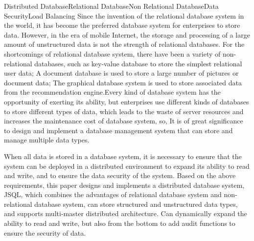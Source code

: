 
\begin{Eabstract}{Distributed Database}{Relational Database}{Non Relational Database}{Data Security}{Load Balancing}
Since the invention of the relational database system in the world, it has become the preferred database system for enterprises to store data. However, in the era of mobile Internet, the storage and processing of a large amount of unstructured data is not the strength of relational databases. For the shortcomings of relational database system, there have been a variety of non-relational databases, such as key-value database to store the simplest relational user data; A document database is used to store a large number of pictures or document data; The graphical database system is used to store associated data from the recommendation engine.Every kind of database system has the opportunity of exerting its ability, but enterprises use different kinds of databases to store different types of data, which leads to the waste of server resources and increases the maintenance cost of database system, so, It is of great significance to design and implement a database management system that can store and manage multiple data types.

When all data is stored in a database system, it is necessary to ensure that the system can be deployed in a distributed environment to expand its ability to read and write, and to ensure the data security of the system. Based on the above requirements, this paper designs and implements a distributed database system, JSQL, which combines the advantages of relational database system and non-relational database system, can store structured and unstructured data types, and supports multi-master distributed architecture. Can dynamically expand the ability to read and write, but also from the bottom to add audit functions to ensure the security of data.


\end{Eabstract}
